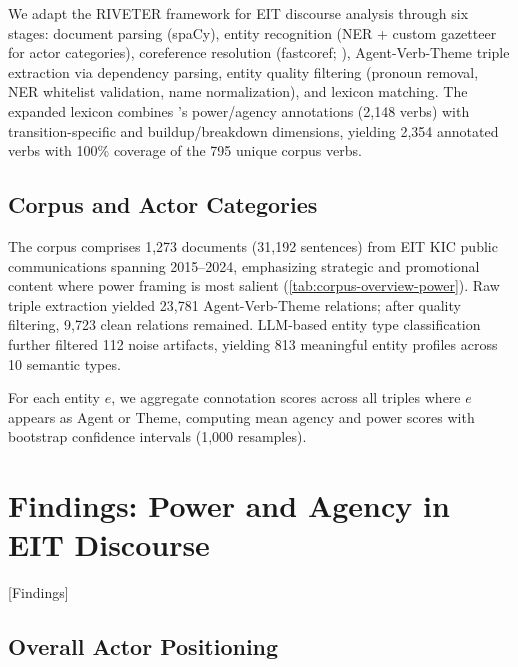 \documentclass[../main.tex]{subfiles}
\begin{document}
We adapt the RIVETER framework \cite{antoniak2023riveter} for EIT discourse analysis through six stages: document parsing (spaCy), entity recognition (NER + custom gazetteer for actor categories), coreference resolution (fastcoref; \cite{otmazgin2023lingmess}), Agent-Verb-Theme triple extraction via dependency parsing, entity quality filtering (pronoun removal, NER whitelist validation, name normalization), and lexicon matching. The expanded lexicon combines \textcite{sap2017connotation}'s power/agency annotations (2,148 verbs) with transition-specific and buildup/breakdown dimensions, yielding 2,354 annotated verbs with 100\% coverage of the 795 unique corpus verbs.

\subsection{Corpus and Actor Categories}

The corpus comprises 1,273 documents (31,192 sentences) from EIT KIC public communications spanning 2015--2024, emphasizing strategic and promotional content where power framing is most salient (\cref{tab:corpus-overview-power}). Raw triple extraction yielded 23,781 Agent-Verb-Theme relations; after quality filtering, 9,723 clean relations remained. LLM-based entity type classification further filtered 112 noise artifacts, yielding 813 meaningful entity profiles across 10 semantic types.

For each entity $e$, we aggregate connotation scores across all triples where $e$ appears as Agent or Theme, computing mean agency and power scores with bootstrap confidence intervals (1,000 resamples).

\section{Findings: Power and Agency in EIT Discourse}[Findings]

\subsection{Overall Actor Positioning}
\end{document}

